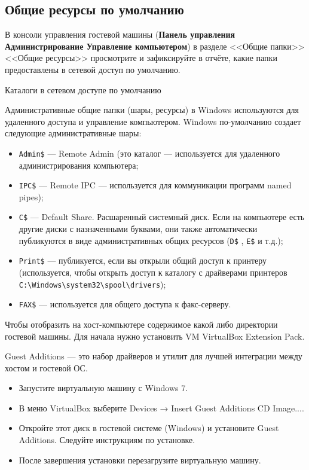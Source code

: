 \subsection{Общие ресурсы по умолчанию}

В консоли управления гостевой машины
(\textbf{Панель управления \rarrow Администрирование
\rarrow Управление компьютером})
в разделе <<Общие папки>> \rarrow <<Общие ресурсы>>
просмотрите и зафиксируйте в отчёте,
какие папки предоставлены в сетевой доступ по умолчанию.

\begin{image}
	\caption{Каталоги в сетевом доступе по умолчанию}
	\label{fig:net:share:dir}
\end{image}

Административные общие папки (шары, ресурсы) в Windows используются
для удаленного доступа и управление компьютером.
Windows по-умолчанию создает следующие административные шары:

\begin{itemize}
	\item \verb|Admin$| --- Remote Admin (это каталог %
		--- используется для удаленного администрирования компьютера;
	\item \verb|IPC$|
		--- Remote IPC --- используется для коммуникации программ named pipes);
	\item \verb|C$| --- Default Share. Расшаренный системный диск.
		Если на компьютере есть другие диски с назначенными буквами,
		они также автоматически публикуются
		в виде административных общих ресурсов (\verb|D$| , \verb|E$| и т.д.);
	\item \verb|Print$| --- публикуется, если вы открыли общий доступ
		к принтеру (используется, чтобы открыть доступ к каталогу
		с драйверами принтеров \verb|C:\Windows\system32\spool\drivers|);
	\item \verb|FAX$| --- используется для общего доступа к факс-серверу.
\end{itemize}


Чтобы отобразить на хост-компьютере содержимое какой либо
директории гостевой машины. Для начала нужно установить 
VM VirtualBox Extension Pack.\par
Guest Additions --- это набор драйверов
и утилит для лучшей интеграции между хостом и гостевой ОС.

\begin{itemize}
	\item Запустите виртуальную машину с Windows 7.
	\item В меню VirtualBox выберите
		Devices → Insert Guest Additions CD Image....
	\item Откройте этот диск в гостевой системе (Windows)
		и установите Guest Additions. Следуйте инструкциям по установке.
	\item После завершения установки перезагрузите виртуальную машину.
\end{itemize}

